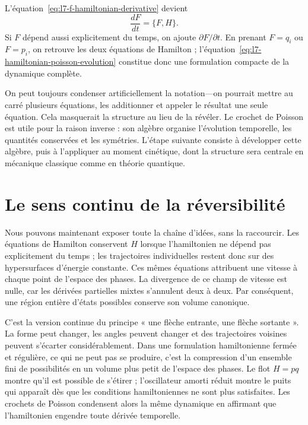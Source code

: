 L’équation~\eqref{eq:l7-f-hamiltonian-derivative} devient
\begin{equation}
  \boxed{\frac{dF}{dt}=\{F,H\}.}
  \label{eq:l7-hamiltonian-poisson-evolution}
\end{equation}
Si \(F\) dépend aussi explicitement du temps, on ajoute \(\partial F/\partial t\). En prenant \(F=q_i\) ou \(F=p_i\), on retrouve les deux équations de Hamilton ; l’équation~\eqref{eq:l7-hamiltonian-poisson-evolution} constitue donc une formulation compacte de la dynamique complète.

On peut toujours condenser artificiellement la notation---on pourrait mettre au carré plusieurs équations, les additionner et appeler le résultat une seule équation. Cela masquerait la structure au lieu de la révéler. Le crochet de Poisson est utile pour la raison inverse : son algèbre organise l’évolution temporelle, les quantités conservées et les symétries. L’étape suivante consiste à développer cette algèbre, puis à l’appliquer au moment cinétique, dont la structure sera centrale en mécanique classique comme en théorie quantique.

\section{Le sens continu de la réversibilité}

Nous pouvons maintenant exposer toute la chaîne d’idées, sans la raccourcir. Les équations de Hamilton conservent \(H\) lorsque l’hamiltonien ne dépend pas explicitement du temps ; les trajectoires individuelles restent donc sur des hypersurfaces d’énergie constante. Ces mêmes équations attribuent une vitesse à chaque point de l’espace des phases. La divergence de ce champ de vitesse est nulle, car les dérivées partielles mixtes s’annulent deux à deux. Par conséquent, une région entière d’états possibles conserve son volume canonique.

C’est la version continue du principe « une flèche entrante, une flèche sortante ». La forme peut changer, les angles peuvent changer et des trajectoires voisines peuvent s’écarter considérablement. Dans une formulation hamiltonienne fermée et régulière, ce qui ne peut pas se produire, c’est la compression d’un ensemble fini de possibilités en un volume plus petit de l’espace des phases. Le flot \(H=pq\) montre qu’il est possible de s’étirer ; l’oscillateur amorti réduit montre le puits qui apparaît dès que les conditions hamiltoniennes ne sont plus satisfaites. Les crochets de Poisson condensent alors la même dynamique en affirmant que l’hamiltonien engendre toute dérivée temporelle.
